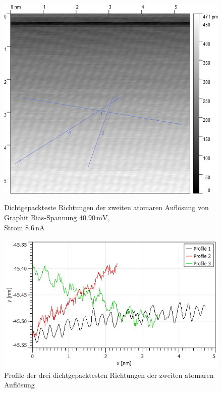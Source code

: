 \documentclass[12pt,a4paper]{scrartcl}
\numberwithin{equation}{section} %
\begin{document}
\begin{figure}[h!]
	\begin{minipage}[t]{0.4\textwidth}
		\includegraphics[width=\linewidth]{../media/B2.5/Atoms2_with_profileLines.png}
		\caption{Dichtgepackteste Richtungen der zweiten atomaren Auflösung von Graphit
			Bias-Spannung $40.90\mathrm{\,mV}$, \\
			Strom $8.6\mathrm{\,nA}$}
		\label{abb:hopg_with_profile_2}
	\end{minipage}
	\begin{minipage}[t]{0.5\textwidth}
		\centering
		\includegraphics[width=\linewidth]{../media/B2.5/profilePlot_area2.png}
		\caption{Profile der drei dichtgepacktesten Richtungen der zweiten atomaren Auflösung}
		\label{abb:hopg_profile_2}
	\end{minipage}
\end{figure}
\end{document}
